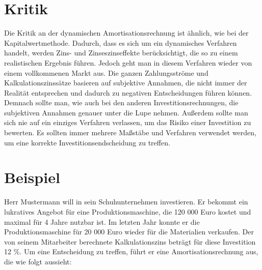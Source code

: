 \section{Kritik}
Die Kritik an der dynamischen Amortisationsrechnung ist ähnlich, wie bei der Kapitalwertmethode. Dadurch, dass es sich um ein dynamisches Verfahren handelt, werden Zins- und Zinseszinseffekte berücksichtigt, die so zu einem realistischen Ergebnis führen. Jedoch geht man in diesem Verfahren wieder von einem vollkommenen Markt aus. Die ganzen Zahlungsströme und Kalkulationszinssätze basieren auf subjektive Annahmen, die nicht immer der Realität entsprechen und dadurch zu negativen Entscheidungen führen können. Demnach sollte man, wie auch bei den anderen Investitionsrechnungen, die subjektiven Annahmen genauer unter die Lupe nehmen. Außerdem sollte man sich nie auf ein einziges Verfahren verlassen, um das Risiko einer Investition zu bewerten. Es sollten immer mehrere Maßstäbe und Verfahren verwendet werden, um eine korrekte Investitionsendscheidung zu treffen.
\newpage
\section{Beispiel}
Herr Mustermann will in sein Schuhunternehmen investieren. Er bekommt ein lukratives Angebot für eine Produktionsmaschine, die 120 000 Euro kostet und maximal für 4 Jahre nutzbar ist. Im letzten Jahr konnte er die Produktionsmaschine für 20 000 Euro wieder für die Materialien verkaufen. Der von seinem Mitarbeiter berechnete Kalkulationszins beträgt für diese Investition 12 \%. Um eine Entscheidung zu treffen, führt er eine Amortisationsrechnung aus, die wie folgt aussieht:

